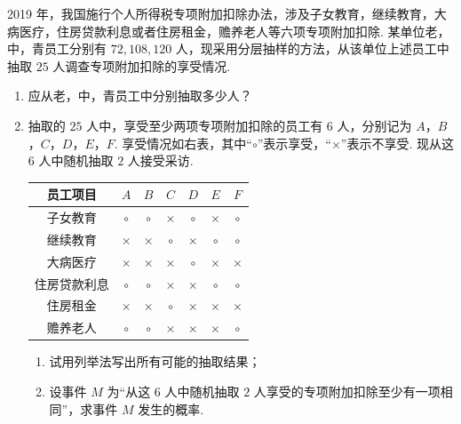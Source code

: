 \begin{problem}
2019 年，我国施行个人所得税专项附加扣除办法，涉及子女教育，继续教育，大病医疗，住房贷款利息或者住房租金，赡养老人等六项专项附加扣除. 某单位老，中，青员工分别有 \(72,108,120\) 人，现采用分层抽样的方法，从该单位上述员工中抽取 \(25\) 人调查专项附加扣除的享受情况.

\begin{enumerate}
\item 应从老，中，青员工中分别抽取多少人？
\item 抽取的 \(25\) 人中，享受至少两项专项附加扣除的员工有 \(6\) 人，分别记为 \(A\)，\(B\)，\(C\)，\(D\)，\(E\)，\(F\). 享受情况如右表，其中“\(\circ\)”表示享受，“\(\times\)”表示不享受. 现从这 \(6\) 人中随机抽取 \(2\) 人接受采访.
\begin{center}
\begin{tabular}{c|cccccc}
员工项目 & \(A\) & \(B\) & \(C\) & \(D\) & \(E\) & \(F\) \\
\hline
子女教育 & \(\circ\) & \(\circ\) & \(\times\) & \(\circ\) & \(\times\) & \(\circ\) \\
继续教育 & \(\times\) & \(\times\) & \(\circ\) & \(\times\) & \(\circ\) & \(\circ\) \\
大病医疗 & \(\times\) & \(\times\) & \(\times\) & \(\circ\) & \(\times\) & \(\times\) \\
住房贷款利息 & \(\circ\) & \(\circ\) & \(\times\) & \(\times\) & \(\circ\) & \(\circ\) \\
住房租金 & \(\times\) & \(\times\) & \(\circ\) & \(\times\) & \(\times\) & \(\times\) \\
赡养老人 & \(\circ\) & \(\circ\) & \(\times\) & \(\times\) & \(\times\) & \(\circ\)
\end{tabular}
\end{center}

\begin{enumerate}
\item 试用列举法写出所有可能的抽取结果；
\item 设事件 \(M\) 为“从这 \(6\) 人中随机抽取 \(2\) 人享受的专项附加扣除至少有一项相同”，求事件 \(M\) 发生的概率.
\end{enumerate}
\end{enumerate}
\end{problem}

